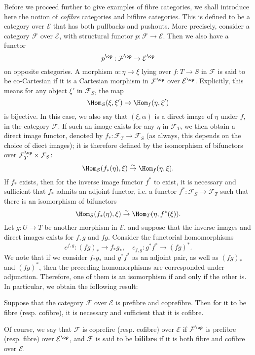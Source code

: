 Before we proceed further to give examples of fibre categories, we shall introduce here the notion of \textit{cofibre} categories and bifibre categories. This is defined to be a category over $\mathcal{E}$ that has both pullbacks and pushouts. More precisely, consider a category $\mathscr{F}$ over $\mathcal{E}$, with structural functor $p:\mathcal{F}\to \mathcal{E}$. Then we also have a functor
\[p^{\op}:\mathcal{F}^{\op}\to \mathcal{E}^{\op}\]
on opposite categories. A morphism $\alpha:\eta\to \xi$ lying over $f:T\to S$ in $\mathcal{F}$ is said to be co-Cartesian if it is a Cartesian morphism in $\mathcal{F}^{\op}$ over $\mathcal{E}^{\op}$. Explicitly, this means for any object $\xi'$ in $\mathcal{F}_S$, the map
\[\Hom_S(\xi,\xi')\to \Hom_f(\eta,\xi')\]
is bijective. In this case, we also say that $(\xi,\alpha)$ is a direct image of $\eta$ under $f$, in the category $\mathcal{F}$. If such an image exists for any $\eta$ in $\mathcal{F}_T$, we then obtain a direct image functor, denoted by $f_*:\mathcal{F}_T\to \mathcal{F}_S$ (as always, this depends on the choice of diect images); it is therefore defined by the isomorphism of bifunctors over $\mathcal{F}_T^{\op}\times\mathcal{F}_S$:
\[\Hom_S(f_*(\eta),\xi)\stackrel{\sim}{\to }\Hom_f(\eta,\xi).\]
If $f_*$ exists, then for the inverse image functor $f^*$ to exist, it is necessary and sufficient that $f_*$ admits an adjoint functor, i.e. a functor $f^*:\mathcal{F}_S\to \mathcal{F}_T$ such that there is an isomorphism of bifunctors
\[\Hom_S(f_*(\eta),\xi)\stackrel{\sim}{\to }\Hom_T(\eta,f^*(\xi)).\]
Let $g:U\to T$ be another morphism in $\mathcal{E}$, and suppose that the inverse images and direct images exists for $f,g$ and $fg$. Consider the functorial homomorphisms
\[c^{f,g}:(fg)_*\to f_*g_*,\quad c_{f,g}:g^*f^*\to (fg)^*.\]
We note that if we consider $f_*g_*$ and $g^*f^*$ as an adjoint pair, as well as $(fg)_*$ and $(fg)^*$, then the preceding homomorphisms are corresponded under adjunction. Therefore, one of them is an isomorphism if and only if the other is. In particular, we obtain the following result:
\begin{proposition}\label{fibre cat bi-prefibre is fibre iff bifire}
Suppose that the category $\mathcal{F}$ over $\mathcal{E}$ is prefibre and coprefibre. Then for it to be fibre (resp. cofibre), it is necessary and sufficient that it is cofibre.
\end{proposition}
Of course, we say that $\mathcal{F}$ is coprefire (resp. cofibre) over $\mathcal{E}$ if $\mathcal{F}^{\op}$ is prefibre (resp. fibre) over $\mathcal{E}^{\op}$, and $\mathcal{F}$ is said to be \textbf{bifibre} if it is both fibre and cofibre over $\mathcal{E}$.
